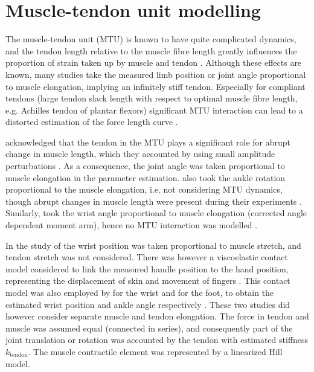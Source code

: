 \section{Muscle-tendon unit modelling}
\label{sec:mtu_modeling}
The muscle-tendon unit (MTU) is known to have quite complicated dynamics, and the tendon length relative to the muscle fibre length greatly influences the proportion of strain taken up by muscle and tendon \cite{zajac_muscle_1989}. Although these effects are known, many studies take the measured limb position or joint angle proportional to muscle elongation, implying an infinitely stiff tendon. Especially for compliant tendons (large tendon slack length with respect to  optimal muscle fibre length, e.g. Achilles tendon of plantar flexors) significant MTU interaction can lead to a distorted estimation of the force length curve \cite{zajac_muscle_1989}. 

\citeauthor{zhang_simultaneous_1997} acknowledged that the tendon in the MTU plays a significant role for abrupt change in muscle length, which they accounted by using small amplitude perturbations \cite{zhang_simultaneous_1997}. As a consequence, the joint angle was taken proportional to muscle elongation in the parameter estimation. \citeauthor{mirbagheri_intrinsic_2000} also took the ankle rotation proportional to the muscle elongation, i.e. not considering MTU dynamics, though abrupt changes in muscle length were present during their experiments \cite{mirbagheri_intrinsic_2000}. Similarly, \citeauthor{de_gooijer-van_de_groep_estimation_2016} took the wrist angle proportional to muscle elongation (corrected angle dependent moment arm), hence no MTU interaction was modelled \cite{de_gooijer-van_de_groep_estimation_2016}. 

In the study of \citeauthor{van_der_helm_identification_2002} the wrist position was taken proportional to muscle stretch, and tendon stretch was not considered. There was however a viscoelastic contact model considered to link the measured handle position to the hand position, representing the displacement of skin and movement of fingers \cite{van_der_helm_identification_2002}. This contact model was also employed by \citeauthor{schouten_nmclab_2008} for the wrist and \citeauthor{mugge_rigorous_2010} for the foot, to obtain the estimated wrist position and ankle angle respectively \cite{schouten_nmclab_2008,mugge_rigorous_2010}. These two studies did however consider separate muscle and tendon elongation. The force in tendon and muscle was assumed equal (connected in series), and consequently part of the joint translation or rotation was accounted by the tendon with estimated stiffness $k_\text{tendon}$. The muscle contractile element was represented by a linearized Hill model. 



